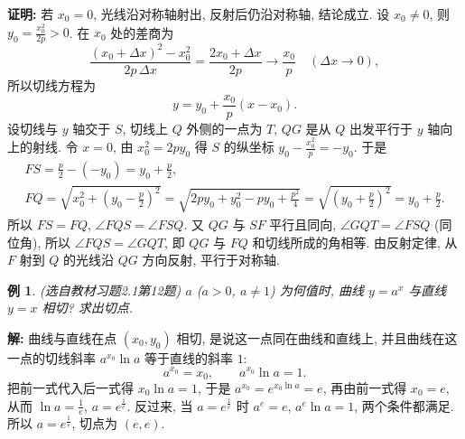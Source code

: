 \documentclass[UTF8,openany]{ctexbook}
\theoremstyle{chinesetextbook}
\newtheorem{example}{例}[section]
\newenvironment{cnproof}{\par\indent\textbf{证明:} \ignorespaces}{\par}
\newenvironment{cnsolution}{\par\indent\textbf{解:} \ignorespaces}{\par}
\begin{document}
\begin{center}
\end{center}
\begin{cnproof}
若 $x_0=0$, 光线沿对称轴射出, 反射后仍沿对称轴, 结论成立. 设 $x_0\ne0$, 则 $\displaystyle y_0=\frac{x_0^2}{2p}>0$. 在 $x_0$ 处的差商为
\[
\frac{(x_0+\Delta x)^2-x_0^2}{2p\,\Delta x}=\frac{2x_0+\Delta x}{2p}\to\frac{x_0}p\quad(\Delta x\to0),
\]
所以切线方程为
\[
y=y_0+\frac{x_0}p(x-x_0).
\]
设切线与 $y$ 轴交于 $S$, 切线上 $Q$ 外侧的一点为 $T$, $QG$ 是从 $Q$ 出发平行于 $y$ 轴向上的射线. 令 $x=0$, 由 $x_0^2=2py_0$ 得 $S$ 的纵坐标 $\displaystyle y_0-\frac{x_0^2}p=-y_0$. 于是
\[
\begin{gathered}
FS=\frac p2-(-y_0)=y_0+\frac p2,\\
FQ=\sqrt{x_0^2+\left(y_0-\frac p2\right)^2}=\sqrt{2py_0+y_0^2-py_0+\frac{p^2}4}=\sqrt{\left(y_0+\frac p2\right)^2}=y_0+\frac p2.
\end{gathered}
\]
所以 $FS=FQ$, $\angle FQS=\angle FSQ$. 又 $QG$ 与 $SF$ 平行且同向, $\angle GQT=\angle FSQ$ (同位角), 所以 $\angle FQS=\angle GQT$, 即 $QG$ 与 $FQ$ 和切线所成的角相等. 由反射定律, 从 $F$ 射到 $Q$ 的光线沿 $QG$ 方向反射, 平行于对称轴.
\end{cnproof}
\begin{example}\label{ex:c2-h1-12}
\textnormal{(选自教材习题2.1第12题)} $a$ ($a>0$, $a\ne1$) 为何值时, 曲线 $y=a^x$ 与直线 $y=x$ 相切? 求出切点.
\end{example}
\begin{cnsolution}
曲线与直线在点 $(x_0,y_0)$ 相切, 是说这一点同在曲线和直线上, 并且曲线在这一点的切线斜率 $a^{x_0}\ln a$ 等于直线的斜率 $1$:
\[
a^{x_0}=x_0,\qquad a^{x_0}\ln a=1.
\]
把前一式代入后一式得 $x_0\ln a=1$, 于是 $a^{x_0}=e^{x_0\ln a}=e$, 再由前一式得 $x_0=e$, 从而 $\displaystyle\ln a=\frac1e$, $a=e^{\frac1e}$. 反过来, 当 $a=e^{\frac1e}$ 时 $a^e=e$, $a^e\ln a=1$, 两个条件都满足. 所以 $a=e^{\frac1e}$, 切点为 $(e,e)$.
\end{cnsolution}
\end{document}
